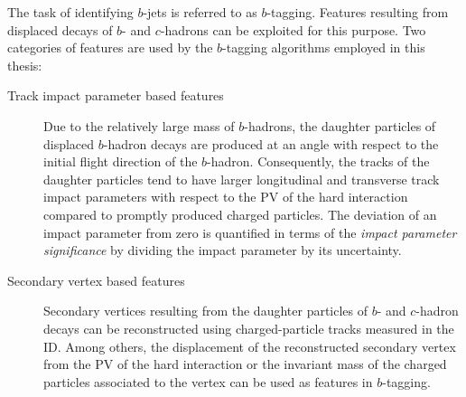 The task of identifying $b$-jets is referred to as $b$-tagging. Features
resulting from displaced decays of $b$- and $c$-hadrons can be exploited for
this purpose. Two categories of features are used by the $b$-tagging algorithms
employed in this thesis:
\begin{description}

\item[Track impact parameter based features] Due to the relatively large mass of
  $b$-hadrons, the daughter particles of displaced $b$-hadron decays are
  produced at an angle with respect to the initial flight direction of the
  $b$-hadron. Consequently, the tracks of the daughter particles tend to have
  larger longitudinal and transverse track impact parameters with respect to the
  PV of the hard interaction compared to promptly produced charged
  particles. The deviation of an impact parameter from zero is quantified in
  terms of the \emph{impact parameter significance} by dividing the impact
  parameter by its uncertainty.

\item[Secondary vertex based features] Secondary vertices resulting from the
  daughter particles of $b$- and $c$-hadron decays can be reconstructed using
  charged-particle tracks measured in the ID. Among others, the displacement of
  the reconstructed secondary vertex from the PV of the hard interaction or the
  invariant mass of the charged particles associated to the vertex can be used
  as features in $b$-tagging.
\end{description}

